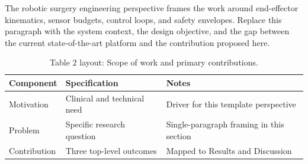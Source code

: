 
The robotic surgery engineering perspective frames the work around end-effector kinematics, sensor budgets, control loops, and safety envelopes. Replace this paragraph with the system context, the design objective, and the gap between the current state-of-the-art platform and the contribution proposed here.

\begin{table}[H]
\caption{Table 2 layout: Scope of work and primary contributions.}
\label{tab:intro_overview}
\centering
\begin{tabular}{>{\raggedright\arraybackslash}p{3.4cm} >{\raggedright\arraybackslash}p{4.6cm} >{\raggedright\arraybackslash}p{5.4cm}}
\toprule
\textbf{Component} & \textbf{Specification} & \textbf{Notes} \\
\midrule
  Motivation & Clinical and technical need & Driver for this template perspective \\
  Problem & Specific research question & Single-paragraph framing in this section \\
  Contribution & Three top-level outcomes & Mapped to Results and Discussion \\
\bottomrule
\end{tabular}
\end{table}
